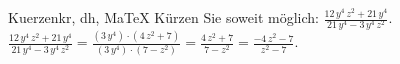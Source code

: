 \begin{MAufgabe}{Kuerzen}{kr, dh, MaTeX}
K\"urzen Sie soweit m\"oglich: $\frac{12\, y^4\, z^2 + 21\, y^4}{21\, y^4 - 3\, y^4\, z^2}$.\\ 
\ifLsg\MLoesung
\quad $\frac{12\, y^4\, z^2 + 21\, y^4}{21\, y^4 - 3\, y^4\, z^2}=\frac{(3\, y^4)\cdot(4\, z^2 + 7)}{(3\, y^4)\cdot(7 - z^2)}=\frac{4\, z^2 + 7}{7 - z^2}=\frac{ - 4\, z^2 - 7}{z^2 - 7}$.\else\relax\fi
 \end{MAufgabe}